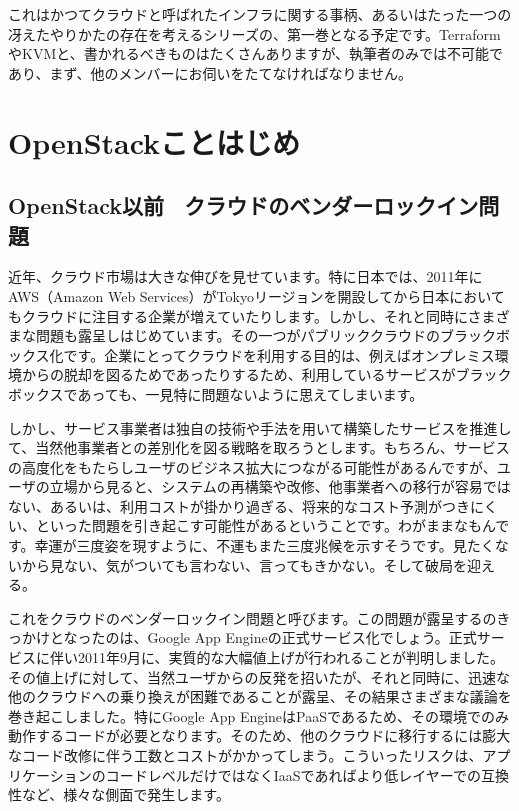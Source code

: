 \documentclass[9pt,b5paper,tombo,openany]{jsbook}
\begin{document}
これはかつてクラウドと呼ばれたインフラに関する事柄、あるいはたった一つの冴えたやりかたの存在を考えるシリーズの、第一巻となる予定です。TerraformやKVMと、書かれるべきものはたくさんありますが、執筆者のみでは不可能であり、まず、他のメンバーにお伺いをたてなければなりません。

\chapter{OpenStackことはじめ}

\begin{figure}
\minitoc
\end{figure}

\section{OpenStack以前 ~クラウドのベンダーロックイン問題}

近年、クラウド市場は大きな伸びを見せています。特に日本では、2011年にAWS（Amazon Web Services）がTokyoリージョンを開設してから日本においてもクラウドに注目する企業が増えていたりします。しかし、それと同時にさまざまな問題も露呈しはじめています。その一つがパブリッククラウドのブラックボックス化です。企業にとってクラウドを利用する目的は、例えばオンプレミス環境からの脱却を図るためであったりするため、利用しているサービスがブラックボックスであっても、一見特に問題ないように思えてしまいます。

しかし、サービス事業者は独自の技術や手法を用いて構築したサービスを推進して、当然他事業者との差別化を図る戦略を取ろうとします。もちろん、サービスの高度化をもたらしユーザのビジネス拡大につながる可能性があるんですが、ユーザの立場から見ると、システムの再構築や改修、他事業者への移行が容易ではない、あるいは、利用コストが掛かり過ぎる、将来的なコスト予測がつきにくい、といった問題を引き起こす可能性があるということです。わがままなもんです。幸運が三度姿を現すように、不運もまた三度兆候を示すそうです。見たくないから見ない、気がついても言わない、言ってもきかない。そして破局を迎える。

これをクラウドのベンダーロックイン問題と呼びます。この問題が露呈するのきっかけとなったのは、Google App Engineの正式サービス化でしょう。正式サービスに伴い2011年9月に、実質的な大幅値上げが行われることが判明しました。その値上げに対して、当然ユーザからの反発を招いたが、それと同時に、迅速な他のクラウドへの乗り換えが困難であることが露呈、その結果さまざまな議論を巻き起こしました。特にGoogle App EngineはPaaSであるため、その環境でのみ動作するコードが必要となります。そのため、他のクラウドに移行するには膨大なコード改修に伴う工数とコストがかかってしまう。こういったリスクは、アプリケーションのコードレベルだけではなくIaaSであればより低レイヤーでの互換性など、様々な側面で発生します。
\end{document}
